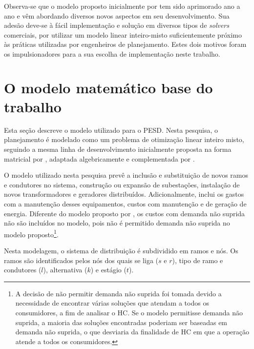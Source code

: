 Observa-se que o modelo proposto inicialmente por  tem sido aprimorado ano a ano e vêm abordando diversos novos aspectos em seu desenvolvimento. Sua adesão deve-se à fácil implementação e solução em diversos tipos de \textit{solvers} comerciais, por utilizar um modelo linear inteiro-misto suficientemente próximo às práticas utilizadas por engenheiros de planejamento. Estes dois motivos foram os impulsionadores para a sua escolha de implementação neste trabalho.





\section{O modelo matemático base do trabalho}

Esta seção descreve o modelo utilizado para o \ac{PESD}. Nesta pesquisa, o planejamento é modelado como um problema de otimização linear inteiro misto, seguindo a mesma linha de desenvolvimento inicialmente proposta na forma matricial por , adaptada algebricamente e complementada por .

O modelo utilizado nesta pesquisa prevê a inclusão e substituição de novos ramos e condutores no sistema, construção ou expansão de subestações, instalação de novos transformadores e geradores distribuídos. Adicionalmente, inclui os gastos com a manutenção desses equipamentos, custos com manutenção e de geração de energia. Diferente do modelo proposto por , os custos com demanda não suprida não são incluídos no modelo, pois não é permitido demanda não suprida no modelo proposto\footnote{A decisão de não permitir demanda não suprida foi tomada devido a necessidade de encontrar várias soluções que atendam a todos os consumidores, a fim de analisar o \ac{HC}. Se o modelo permitisse demanda não suprida, a maioria das soluções encontradas poderiam ser baseadas em demanda não suprida, o que desviaria da finalidade de \ac{HC} em que a operação atende a todos os consumidores.}. 

Nesta modelagem, o sistema de distribuição é subdividido em ramos e nós. Os ramos são identificados pelos nós dos quais se liga ($s$ e $r$), tipo de ramo e condutores ($l$), alternativa ($k$) e estágio ($t$).


